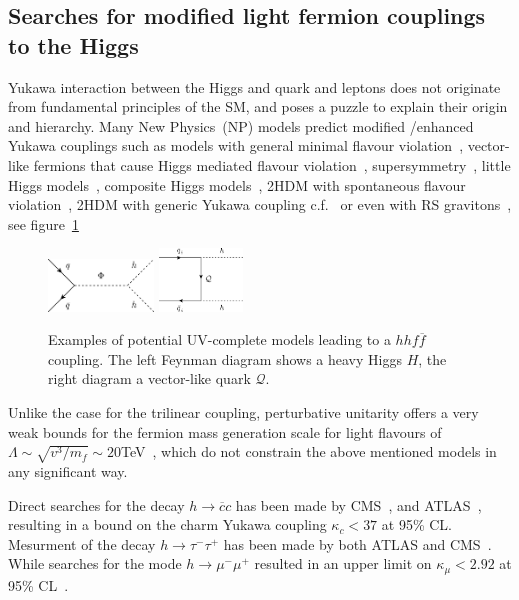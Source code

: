 \documentclass[12pt]{article}
\renewcommand{\bar}{\overline}
\begin{document}
\subsection*{Searches for modified light fermion couplings to the Higgs} 
\par  Yukawa interaction between the Higgs and quark and leptons does not originate from fundamental principles of the SM, and poses a puzzle to explain their origin and hierarchy. Many New Physics~(NP) models predict modified /enhanced Yukawa couplings such as models with general minimal flavour violation~\cite{PhysRevD.80.076002}, vector-like fermions that cause Higgs mediated flavour violation~\cite{Giudice:2008uua,Bar-Shalom:2018rjs}, supersymmetry~\cite{Dery:2014kxa}, little Higgs models~\cite{Dib:2005re}, composite Higgs models~\cite{Carmona:2013cq,Gillioz:2013pba,Delaunay:2013iia,Delaunay:2013pwa}, 2HDM with spontaneous flavour violation~\cite{Egana-Ugrinovic:2018znw, Egana-Ugrinovic:2019dqu}, 2HDM with generic Yukawa coupling c.f.~\cite{Crivellin:2013wna}  or even with RS gravitons~\cite{vonHarling:2016vhf}, see figure~\ref{fig_uv_qqhh}
\begin{figure}[!h]
	\centering
	\includegraphics[width = 0.25\textwidth]{qqh_2hdm_prpg}
	\hspace{0.5 cm}
	\includegraphics[width = 0.2\textwidth]{VLQ}
	\caption{Examples of potential UV-complete models leading to a  $hh f \bar{f} $ coupling. The left Feynman diagram shows a heavy Higgs $H$, the right diagram a vector-like quark $\mathcal Q $.} %
	\label{fig_uv_qqhh}
\end{figure}
Unlike the case for the trilinear coupling, perturbative unitarity offers a very weak bounds for the fermion mass generation scale for light flavours of $ \Lambda \sim \sqrt{v^3/m_f}\sim 20$TeV~\cite{PhysRevLett.59.2405,Dicus:2004rg}, which do not constrain the above mentioned models in any significant way. \\
\par Direct searches for the decay $ h\to \bar c c$ has been made by CMS~\cite{CMS-PAS-HIG-18-031}, and ATLAS~\cite{ATL-PHYS-PUB-2018-016}, resulting in a bound on the charm Yukawa coupling $\kappa_c < 37$ at 95\% CL. Mesurment of the decay $h\to \tau^- \tau^+$ has been made by both ATLAS and CMS~\cite{Sirunyan:2017khh,Aaboud:2018pen}. While searches for the mode $ h\to \mu^- \mu^+$  resulted in an upper limit on $\kappa_\mu < 2.92$ at 95\% CL~\cite{Sirunyan:2018hbu,ATLAS-CONF-2019-028}.\\
\end{document}

